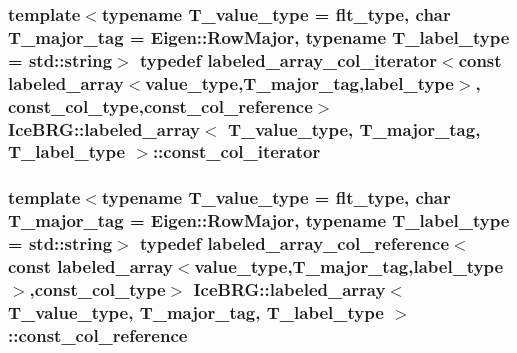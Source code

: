 \subsubsection[{const\+\_\+col\+\_\+iterator}]{\setlength{\rightskip}{0pt plus 5cm}template$<$typename T\+\_\+value\+\_\+type = flt\+\_\+type, char T\+\_\+major\+\_\+tag = Eigen\+::\+Row\+Major, typename T\+\_\+label\+\_\+type = std\+::string$>$ typedef {\bf labeled\+\_\+array\+\_\+col\+\_\+iterator}$<$const {\bf labeled\+\_\+array}$<${\bf value\+\_\+type},T\+\_\+major\+\_\+tag,{\bf label\+\_\+type}$>$, {\bf const\+\_\+col\+\_\+type},{\bf const\+\_\+col\+\_\+reference}$>$ {\bf Ice\+B\+R\+G\+::labeled\+\_\+array}$<$ T\+\_\+value\+\_\+type, T\+\_\+major\+\_\+tag, T\+\_\+label\+\_\+type $>$\+::{\bf const\+\_\+col\+\_\+iterator}}\label{classIceBRG_1_1labeled__array_a2fd3d1ad11efc9bbfb307619cda3a695}
\hypertarget{classIceBRG_1_1labeled__array_ac655d340cc0011b66a5b8433c76841e3}{}
\subsubsection[{const\+\_\+col\+\_\+reference}]{\setlength{\rightskip}{0pt plus 5cm}template$<$typename T\+\_\+value\+\_\+type = flt\+\_\+type, char T\+\_\+major\+\_\+tag = Eigen\+::\+Row\+Major, typename T\+\_\+label\+\_\+type = std\+::string$>$ typedef {\bf labeled\+\_\+array\+\_\+col\+\_\+reference}$<$const {\bf labeled\+\_\+array}$<${\bf value\+\_\+type},T\+\_\+major\+\_\+tag,{\bf label\+\_\+type}$>$,{\bf const\+\_\+col\+\_\+type}$>$ {\bf Ice\+B\+R\+G\+::labeled\+\_\+array}$<$ T\+\_\+value\+\_\+type, T\+\_\+major\+\_\+tag, T\+\_\+label\+\_\+type $>$\+::{\bf const\+\_\+col\+\_\+reference}}\label{classIceBRG_1_1labeled__array_ac655d340cc0011b66a5b8433c76841e3}
\hypertarget{classIceBRG_1_1labeled__array_aeba72c01006c312aedb340192a56901a}{}
